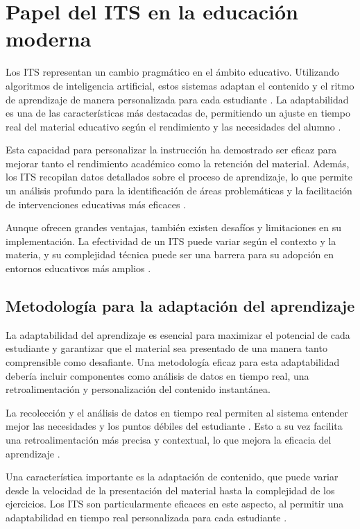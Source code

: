 \section{Papel del ITS en la educación moderna}

Los ITS representan un cambio pragmático en el ámbito educativo. Utilizando algoritmos de inteligencia artificial, estos sistemas adaptan el contenido y el ritmo de aprendizaje de manera personalizada para cada estudiante \cite{Aleven2016}. La adaptabilidad es una de las características más destacadas de, permitiendo un ajuste en tiempo real del material educativo según el rendimiento y las necesidades del alumno \cite{Koedinger2013}.

Esta capacidad para personalizar la instrucción ha demostrado ser eficaz para mejorar tanto el rendimiento académico como la retención del material. Además, los ITS recopilan datos detallados sobre el proceso de aprendizaje, lo que permite un análisis profundo para la identificación de áreas problemáticas y la facilitación de intervenciones educativas más eficaces \cite{VanLehn2011}.

Aunque ofrecen grandes ventajas, también existen desafíos y limitaciones en su implementación. La efectividad de un ITS puede variar según el contexto y la materia, y su complejidad técnica puede ser una barrera para su adopción en entornos educativos más amplios \cite{Sottilare2017}.


\subsection{Metodología para la adaptación del aprendizaje}

La adaptabilidad del aprendizaje es esencial para maximizar el potencial de cada estudiante y garantizar que el material sea presentado de una manera tanto comprensible como desafiante. Una metodología eficaz para esta adaptabilidad debería incluir componentes como análisis de datos en tiempo real, una retroalimentación y personalización del contenido instantánea.

La recolección y el análisis de datos en tiempo real permiten al sistema entender mejor las necesidades y los puntos débiles del estudiante \cite{Fancsali2019}. Esto a su vez facilita una retroalimentación más precisa y contextual, lo que mejora la eficacia del aprendizaje \cite{Heffernan2014}.

Una característica importante es la adaptación de contenido, que puede variar desde la velocidad de la presentación del material hasta la complejidad de los ejercicios. Los ITS son particularmente eficaces en este aspecto, al permitir una adaptabilidad en tiempo real personalizada para cada estudiante \cite{Aleven2016}.

